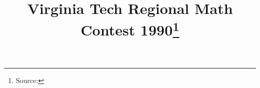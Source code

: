 \documentclass[10pt]{article}
\begin{document}
\title{Virginia Tech Regional Math Contest 1990\footnote{Source: \source}}
\author{\vspace{-2ex}}
\date{\vspace{-6ex}} %
\maketitle








\end{document}
